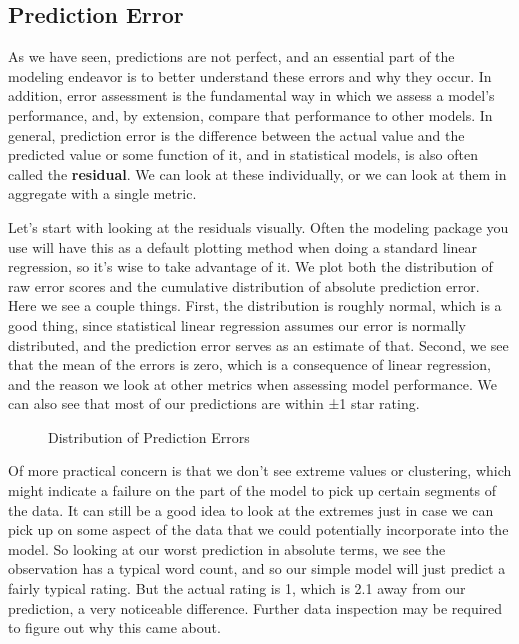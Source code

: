 \documentclass[
  letterpaper,
]{krantz}
\begin{document}
\subsection{Prediction Error}\label{sec-lm-prediction-error}

As we have seen, predictions are not perfect, and an essential part of
the modeling endeavor is to better understand these errors and why they
occur. In addition, error assessment is the fundamental way in which we
assess a model's performance, and, by extension, compare that
performance to other models. In general, prediction error is the
difference between the actual value and the predicted value or some
function of it, and in statistical models, is also often called the
\textbf{residual}. We can look at these individually, or we can look at
them in aggregate with a single metric.

Let's start with looking at the residuals visually. Often the modeling
package you use will have this as a default plotting method when doing a
standard linear regression, so it's wise to take advantage of it. We
plot both the distribution of raw error scores and the cumulative
distribution of absolute prediction error. Here we see a couple things.
First, the distribution is roughly normal, which is a good thing, since
statistical linear regression assumes our error is normally distributed,
and the prediction error serves as an estimate of that. Second, we see
that the mean of the errors is zero, which is a consequence of linear
regression, and the reason we look at other metrics when assessing model
performance. We can also see that most of our predictions are within ±1
star rating.

\begin{figure}[H]


\caption{\label{fig-my-first-model-error-plot}Distribution of Prediction
Errors}

\end{figure}%

Of more practical concern is that we don't see extreme values or
clustering, which might indicate a failure on the part of the model to
pick up certain segments of the data. It can still be a good idea to
look at the extremes just in case we can pick up on some aspect of the
data that we could potentially incorporate into the model. So looking at
our worst prediction in absolute terms, we see the observation has a
typical word count, and so our simple model will just predict a fairly
typical rating. But the actual rating is 1, which is 2.1 away from our
prediction, a very noticeable difference. Further data inspection may be
required to figure out why this came about.
\end{document}
